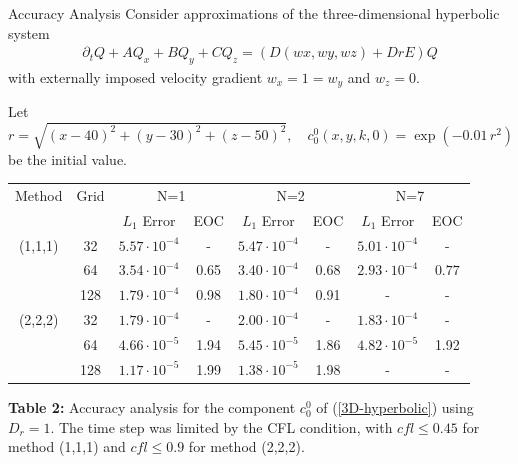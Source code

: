     \begin{frame}{Accuracy Analysis}
    	\scriptsize
    	Consider approximations of the three-dimensional hyperbolic
    	system
    	\begin{align}
    		    	\partial_tQ + AQ_x + BQ_y + CQ_z = (D(wx, wy,wz) + DrE)Q \label{3D-hyperbolic}
    	\end{align}
        with externally imposed velocity gradient $w_x=1=w_y$ and $w_z=0$.
 
    	Let 
    	\[
    	r = \sqrt{(x-40)^2+(y-30)^2+(z-50)^2}, \quad
    	c^0_0(x, y, k, 0) = \exp(-0.01 \, r^2)
    	\] 
    	be the initial value.
    	
    	\medskip
    	\centering
    	\begin{tabular}{|c|c|c|c|c|c|c|c|}
    		\hline
    		Method & Grid & \multicolumn{2}{c|}{N=1} & \multicolumn{2}{c|}{N=2} & \multicolumn{2}{c|}{N=7} \\
    		\cline{3-8}
    		&  & $L_1$ Error & EOC & $L_1$ Error & EOC & $L_1$ Error & EOC \\
    		\hline
    		(1,1,1) & 32  & $5.57\cdot10^{-4}$ & -    & $5.47\cdot10^{-4}$ & -    & $5.01 \cdot10^{-4} $ & - \\
    		& 64  & $3.54\cdot10^{-4}$ & 0.65 & $3.40\cdot10^{-4}$ & 0.68 & $2.93\cdot10^{-4}$ & $0.77$ \\
    		& 128 & $1.79\cdot10^{-4}$ & 0.98 & $1.80\cdot10^{-4}$ & 0.91 & - & - \\
    		\hline
    		(2,2,2) & 32  & $1.79\cdot10^{-4}$ & -    & $2.00\cdot10^{-4}$ & -    & $1.83\cdot10^{-4}$ & - \\
    		& 64  & $4.66\cdot10^{-5}$ & 1.94 & $5.45\cdot10^{-5}$ & 1.86 & $4.82\cdot10^{-5}$ & 1.92 \\
    		& 128 & $1.17\cdot10^{-5}$ & 1.99 & $1.38\cdot10^{-5}$ & 1.98 & - & - \\
    		\hline
    	\end{tabular}
    
    	\vspace{0.5em}
    	\footnotesize{
    		\textbf{Table 2:} Accuracy analysis for the component $c^0_0$ of (\ref{3D-hyperbolic}) using $D_r=1$. The time step was limited by the CFL condition, with $cfl \le 0.45$ for method (1,1,1) and $cfl \le 0.9$ for method (2,2,2).  
    	}
    \end{frame}
    
    
    
